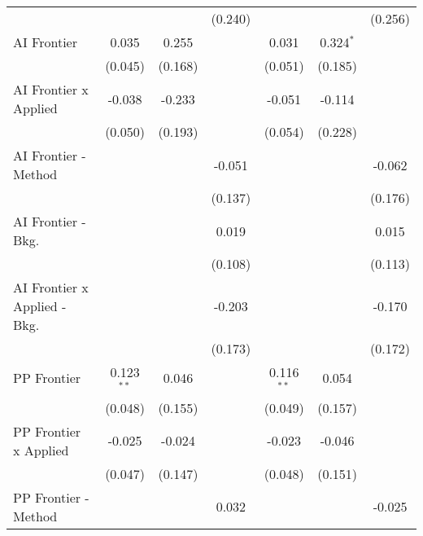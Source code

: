 \begin{tabular}{lcccccc}
                                  &                &                & (0.240)        &                &               & (0.256)\\   
   AI Frontier                    & 0.035          & 0.255          &                & 0.031          & 0.324$^{*}$   &   \\   
                                  & (0.045)        & (0.168)        &                & (0.051)        & (0.185)       &   \\   
   AI Frontier x Applied          & -0.038         & -0.233         &                & -0.051         & -0.114        &   \\   
                                  & (0.050)        & (0.193)        &                & (0.054)        & (0.228)       &   \\   
   AI Frontier - Method           &                &                & -0.051         &                &               & -0.062\\   
                                  &                &                & (0.137)        &                &               & (0.176)\\   
   AI Frontier - Bkg.             &                &                & 0.019          &                &               & 0.015\\   
                                  &                &                & (0.108)        &                &               & (0.113)\\   
   AI Frontier x Applied - Bkg.   &                &                & -0.203         &                &               & -0.170\\   
                                  &                &                & (0.173)        &                &               & (0.172)\\   
   PP Frontier                    & 0.123$^{**}$   & 0.046          &                & 0.116$^{**}$   & 0.054         &   \\   
                                  & (0.048)        & (0.155)        &                & (0.049)        & (0.157)       &   \\   
   PP Frontier x Applied          & -0.025         & -0.024         &                & -0.023         & -0.046        &   \\   
                                  & (0.047)        & (0.147)        &                & (0.048)        & (0.151)       &   \\   
   PP Frontier - Method           &                &                & 0.032          &                &               & -0.025\\   

\end{tabular}
